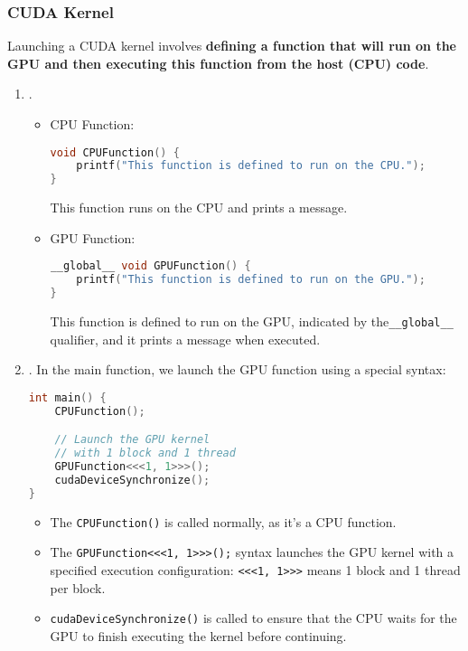 \subsubsection{CUDA Kernel}

Launching a CUDA kernel involves \textbf{defining a function that will run on the GPU and then executing this function from the host (CPU) code}.

\begin{enumerate}
    \item {}.
    \begin{itemize}
        \item CPU Function:
\begin{lstlisting}[language=C++]
void CPUFunction() {
    printf("This function is defined to run on the CPU.");
}\end{lstlisting}
        This function runs on the CPU and prints a message.

        \item GPU Function:
\begin{lstlisting}[language=C++]
__global__ void GPUFunction() {
    printf("This function is defined to run on the GPU.");
}\end{lstlisting}
        This function is defined to run on the GPU, indicated by the\break \texttt{\_\_global\_\_} qualifier, and it prints a message when executed.
    \end{itemize}


    \item {}. In the main function, we launch the GPU function using a special syntax:
    \begin{lstlisting}[language=C++]
int main() {
    CPUFunction();

    // Launch the GPU kernel
    // with 1 block and 1 thread
    GPUFunction<<<1, 1>>>();
    cudaDeviceSynchronize();
}
    \end{lstlisting}
    \begin{itemize}
        \item The \texttt{CPUFunction()} is called normally, as it's a CPU function.
        \item The \texttt{GPUFunction<<<1, 1>>>();} syntax launches the GPU kernel with a specified execution configuration: \texttt{<<<1, 1>>>} means 1 block and 1 thread per block.
        \item \texttt{cudaDeviceSynchronize()} is called to ensure that the CPU waits for the GPU to finish executing the kernel before continuing.
    \end{itemize}
\end{enumerate}
